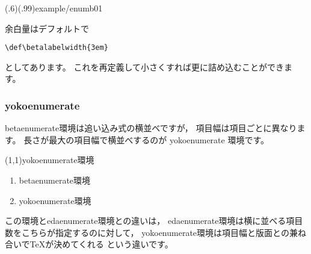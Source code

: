 \documentclass[fleqn,a4j]{jarticle}
\begin{document}
\showexample[betaenumerate](.6)(.99){example/enumb01}

余白量はデフォルトで
\begin{jquote}
\begin{verbatim}
\def\betalabelwidth{3em}
\end{verbatim}
\end{jquote}
としてあります。
これを再定義して小さくすれば更に詰め込むことができます。

\subsubsection{\textsf{yokoenumerate}}
\textsf{betaenumerate}環境は追い込み式の横並べですが，
項目幅は項目ごとに異なります。
長さが最大の項目幅で横並べするのが \textsf{yokoenumerate} 環境です。

\begin{showEx}(1,1){\textsf{yokoenumerate}環境}
\begin{enumerate}[1.~]
\item \textsf{betaenumerate}環境

\item \textsf{yokoenumerate}環境
\end{enumerate}
\end{showEx}

この環境と\textsf{edaenumerate}環境との違いは，
\textsf{edaenumerate}環境は横に並べる項目数をこちらが指定するのに対して，
\textsf{yokoenumerate}環境は項目幅と版面との兼ね合いで\TeX が決めてくれる
という違いです。
\end{document}
